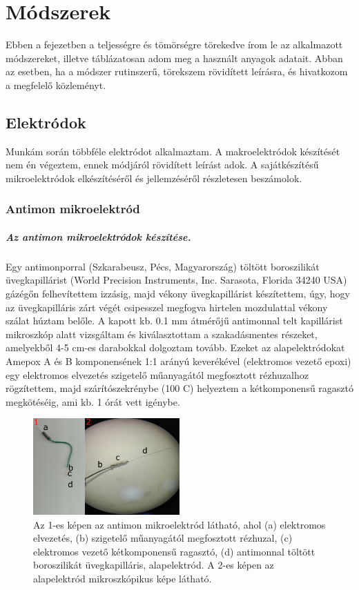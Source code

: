 \chapter{Módszerek}
\pagestyle{headings}

Ebben a fejezetben a teljességre és tömörségre törekedve írom le az alkalmazott módszereket, illetve táblázatosan adom meg a használt anyagok adatait. Abban az esetben, ha a módszer rutinszerű, törekszem rövidített leírásra, és hivatkozom a megfelelő közleményt.

\section{Elektródok}

Munkám során többféle elektródot alkalmaztam. A makroelektródok készítését nem én végeztem, ennek módjáról rövidített leírást adok. A sajátkészítésű mikroelektródok elkészítéséről és jellemzéséről részletesen beszámolok.

\subsection{Antimon mikroelektród}
\paragraph{Az antimon mikroelektródok készítése.}
Egy antimonporral (Szkarabeusz, Pécs, Magyarország) töltött boroszilikát üvegkapillárist (World Precision Instruments, Inc. Sarasota, Florida 34240 USA) gázégőn felhevítettem izzásig, majd vékony üvegkapillárist készítettem, úgy, hogy az üvegkapilláris zárt végét csipesszel megfogva hirtelen mozdulattal vékony szálat húztam belőle. A kapott kb. 0.1 mm átmérőjű antimonnal telt kapillárist mikroszkóp alatt vizsgáltam és kiválasztottam a szakadásmentes részeket, amelyekből 4-5 cm-es darabokkal dolgoztam tovább. Ezeket az alapelektródokat Amepox A és B komponensének 1:1 arányú keverékével (elektromos vezető epoxi) egy elektromos elvezetés szigetelő műanyagától megfosztott rézhuzalhoz rögzítettem, majd szárítószekrénybe (100 \textdegree C) helyeztem a kétkomponensű ragasztó megkötéséig, ami kb. 1 órát vett igénybe.

\begin{figure}[h]
\centering
\includegraphics[width=0.5\textwidth]{img/antimon.png}
\caption{Az 1-es képen az antimon mikroelektród látható, ahol (a) elektromos elvezetés, (b) szigetelő műanyagától megfosztott rézhuzal, (c) elektromos vezető kétkomponensű ragasztó, (d) antimonnal töltött boroszilikát üvegkapilláris, alapelektród. A 2-es képen az alapelektród mikroszkópikus képe látható.}
\label{fig:ionophores}
\end{figure}

